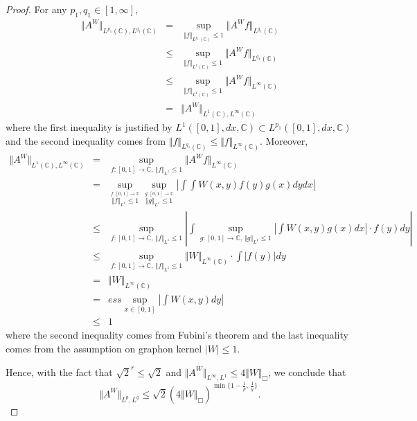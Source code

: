 \begin{proof}
For any $p_1,q_1 \in [1,\infty]$,
\begin{eqnarray*}
	\Vert A^W \Vert_{L^{p_1}(\mathbb{C}), L^{q_1}(\mathbb{C})} &=& \sup_{ \Vert f \Vert_{L^{p_1}(\mathbb{C})} \leq 1 } \Vert A^W f \Vert_{L^{q_1}(\mathbb{C}) }\\
	&\leq & \sup_{ \Vert f \Vert_{L^1(\mathbb{C})} \leq 1 } \Vert A^W f \Vert_{L^{q_1}(\mathbb{C})} \\
	& \leq & \sup_{ \Vert f \Vert_{L^1(\mathbb{C})} \leq 1 } \Vert A^W f \Vert_{L^{\infty}(\mathbb{C})} \\
	&=& \Vert A^W \Vert_{L^{1}(\mathbb{C}), L^\infty(\mathbb{C})}
\end{eqnarray*}
where the first inequality is justified by $L^1([0,1], dx, \mathbb{C}) \subset L^{p_1}([0,1], dx, \mathbb{C}) $ and the second inequality comes from $\Vert f \Vert_{L^{q_1}(\mathbb{C})} \leq \Vert f \Vert_{L^\infty(\mathbb{C})}$.
Moreover,
\begin{eqnarray*}
	\Vert A^W \Vert_{L^1(\mathbb{C}), L^\infty(\mathbb{C})} &=& \sup_{ f: [0,1] \to \mathbb{C},\, \Vert f \Vert_{L^1} \leq 1 } \Vert A^W f \Vert_{L^\infty(\mathbb{C})}\\
	&= &  \sup_{ \stackrel{f: [0,1] \to \mathbb{C}}{ \Vert f \Vert_{L^1} \leq 1} }  \sup_{ \stackrel{g: [0,1] \to \mathbb{C}}{\Vert g \Vert_{L^1} \leq 1} }  \left\vert \int \int W(x,y)f(y) g(x) dy dx \right\vert \\
	&\leq& \sup_{ f: [0,1] \to \mathbb{C}, \,  \Vert f \Vert_{L^1} \leq 1 }  \left\vert \int \sup_{ g: [0,1] \to \mathbb{C}, \,  \Vert g \Vert_{L^1} \leq 1 } \left\vert \int W(x,y)g(x)dx \right\vert \cdot  f(y) dy \right\vert \\
	&\leq& \sup_{ f: [0,1] \to \mathbb{C}, \,  \Vert f \Vert_{L^1} \leq 1 } \Vert W \Vert_{L^\infty(\mathbb{C})} \cdot  \int \vert f(y)  \vert dy \\
	&=&  \Vert W \Vert_{L^\infty(\mathbb{C})} \\
	&=& ess\sup_{x \in [0,1]} \left\vert \int W(x,y) dy \right\vert \\
	&\leq & 1
\end{eqnarray*}
where the second inequality comes from Fubini's theorem and the last inequality comes from the assumption on graphon kernel $|W| \leq 1$.

Hence, with the fact that $\sqrt{2}^r \leq \sqrt{2}$ and $\Vert A^W \Vert_{L^{\infty}, L^1} \leq 4 \Vert W \Vert_{\Box}$, we conclude that
$$
	\Vert A^W \Vert_{L^{p}, L^{q}} \leq \sqrt{2} \left( 4 \Vert W \Vert_{\Box} \right)^{\min \{ 1- \frac{1}{p}, \, \frac{1}{q} \} }.	
$$	
\end{proof}

